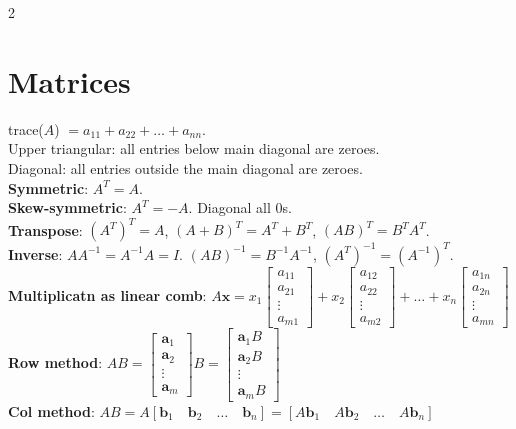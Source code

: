 \documentclass[10pt]{article}
\begin{document}
\begin{multicols*}{2}
\section*{Matrices}
trace($A$) $= a_{11} + a_{22} + \ldots + a_{nn}$.\\
Upper triangular: all entries below main diagonal are zeroes.\\
Diagonal: all entries outside the main diagonal are zeroes.\\
\textbf{Symmetric}: $A^T = A$.\\
\textbf{Skew-symmetric}: $A^T = -A$. Diagonal all 0s.\\
\textbf{Transpose}: $(A^T)^T=A$, $(A+B)^T = A^T + B^T$, $(AB)^T = B^TA^T$.\\
\textbf{Inverse}: $AA^{-1} = A^{-1}A = I$. $(AB)^{-1} = B^{-1}A^{-1}$, $(A^T)^{-1} = (A^{-1})^T$.\\
\textbf{Multiplicatn as linear comb}: $A\mathbf{x} = x_1\begin{bmatrix} a_{11} \\ a_{21} \\ \vdots \\ a_{m1} \end{bmatrix} + x_2\begin{bmatrix} a_{12} \\ a_{22} \\ \vdots \\ a_{m2} \end{bmatrix} + \dots + x_n\begin{bmatrix} a_{1n} \\ a_{2n} \\ \vdots \\ a_{mn} \end{bmatrix}$\\
\textbf{Row method}: $AB = \begin{bmatrix} \mathbf{a}_1 \\ \mathbf{a}_2 \\ \vdots \\ \mathbf{a}_m \end{bmatrix} B = \begin{bmatrix} \mathbf{a}_1 B \\ \mathbf{a}_2 B \\ \vdots \\ \mathbf{a}_m B \end{bmatrix}$\\
\textbf{Col method}: $AB = A[\mathbf{b}_1 \quad \mathbf{b}_2 \quad \dots \quad \mathbf{b}_n] = [A\mathbf{b}_1 \quad A\mathbf{b}_2 \quad \dots \quad A\mathbf{b}_n]$\\


\end{multicols*}
\end{document}
